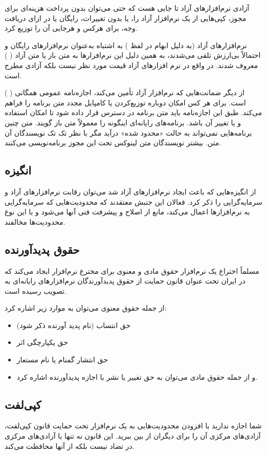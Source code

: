 آزادی نرم‌افزارهای آزاد تا جایی هست که حتی می‌توان بدون پرداخت هزینه‌ای برای مجوز، کپی‌هایی از یک نرم‌افزار آزاد را، یا بدون تغییرات، رایگان یا در ازای دریافت وجه، برای هرکس و هرجایی آن را توزیع کرد.

نرم‌افزارهای آزاد (به دلیل ابهام در لفظ 
) به اشتباه به‌عنوان نرم‌افزارهای رایگان و احتمالاً بی‌ارزش تلقی می‌شدند، به همین دلیل این نرم‌افزارها به متن باز یا متن آزاد (
) معروف شدند. در واقع در نرم افزارهای آزاد قیمت مورد نظر نیست بلکه آزادی مطرح است.

از دیگر ضمانت‌هایی که نرم‌افزار آزاد تأمین می‌کند، اجازه‌نامه عمومی همگانی (
) است. 
 برای هر کس امکان دوباره توزیع‌کردن یا کامپایل مجدد متن برنامه را فراهم می‌کند. طبق این اجازه‌نامه باید متن برنامه در دسترس قرار داده شود تا امکان استفاده و یا تغییر آن باشد. برنامه‌های رایانه‌ای اینگونه را معمولاً متن باز گویند. متن چنین برنامه‌هایی نمی‌تواند به حالت «محدود شده» درآید مگر با نظر تک تک نویسندگان آن متن. بیشتر نویسندگان متن لینوکس تحت این مجوز برنامه‌نویسی می‌کنند.
 
\subsection*{انگیزه}
از انگیزه‌هایی که باعث ایجاد نرم‌افزارهای آزاد شد می‌توان رقابت نرم‌افزارهای آزاد و سرمایه‌گرایی را ذکر کرد. فعالان این جنبش معتقدند که محدودیت‌هایی که سرمایه‌گرایی به نرم‌افزارها اعمال می‌کند، مانع از اصلاح و پیشرفت فنی آنها می‌شود و با این نوع محدودیت‌ها مخالفند.
\subsection*{حقوق پدیدآورنده}
مسلماً اختراع یک نرم‌افزار حقوق مادی و معنوی برای مخترع نرم‌افزار ایجاد می‌کند که در ایران تحت عنوان قانون حمایت از حقوق پدیدآورندگان نرم‌افزارهای رایانه‌ای به تصویب رسیده است.

از جمله حقوق معنوی می‌توان به موارد زیر اشاره کرد:
\begin{itemize}
	\renewcommand{\labelitemi}{$‎\circ‎$}
\item حق انتساب (نام پدید آورنده ذکر شود)
\item حق یکپارچگی اثر
\item حق انتشار گمنام یا نام مستعار
\item و از جمله حقوق مادی می‌توان به حق تغییر یا نشر با اجازه پدیدآورنده اشاره کرد.
\end{itemize}
\subsection*{کپی‌لفت}
شما اجازه ندارید با افزودن محدودیت‌هایی به یک نرم‌افزار تحت حمایت قانون کپی‌لفت، آزادی‌های مرکزی آن را برای دیگران از بین ببرید. این قانون نه تنها با آزادی‌های مرکزی در تضاد نیست بلکه از آنها محافظت می‌کند.

